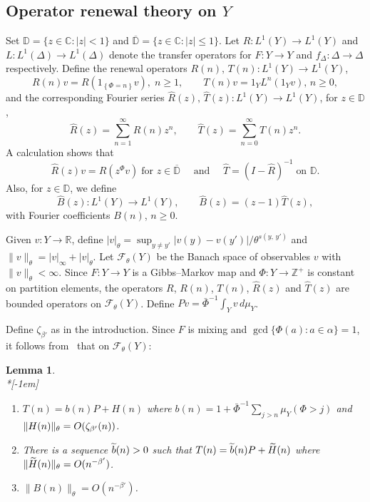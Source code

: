 \documentclass[10pt]{amsart}
\newtheorem{lemm}[theo]{Lemma}\newtheorem{prop}[theo]{Proposition}\newtheorem{coro}[theo]{Corollary}\newtheorem{conj}[theo]{Conjecture}
\theoremstyle{definition}\newtheorem{defi}[theo]{Definition}\newtheorem{rema}[theo]{Remark}\newtheorem{exam}[theo]{Example}\newtheorem{exem}[theo]{Example}\newtheorem{nota}[theo]{Notation}
\newcommand{\R}{\mathbb{R}}
\newcommand{\Z}{\mathbb{Z}}
\newcommand{\CX}{\mathbb{C}}
\newcommand{\D}{\mathbb{D}}
\newcommand{\cF}{\mathcal{F}}
\newcommand{\hB}{\widehat{B}}
\newcommand{\hR}{\widehat{R}}
\newcommand{\hT}{\widehat{T}}
\newcommand{\tH}{\widetilde{H}}
\newcommand{\barD}{\overline{\D}}
\newcommand{\bPhi}{\bar{\Phi}}
\newcommand*{\alphenumi}{\renewcommand*{\theenumi}{\alph{enumi}}}
\let\oldtilde\tilde
\renewcommand*{\tilde}[1]{\mathchoice{\widetilde{#1}}{\widetilde{#1}}{\oldtilde{#1}}{\oldtilde{#1}}}
\begin{document}
\subsection{Operator renewal theory on \texorpdfstring{$Y$}{Y}}\label{sec:TR}

Set $\D=\{z\in\CX:|z|<1\}$ and $\barD=\{z\in\CX:|z|\le1\}$. Let $R:L^1(Y)\to L^1(Y)$ and $L:L^1(\Delta)\to L^1(\Delta)$ denote the transfer operators for $F:Y\to Y$ and $f_\Delta:\Delta\to\Delta$ respectively. Define the renewal operators $R(n),\,T(n):L^1(Y)\to L^1(Y)$,
\[
R(n)v=R\left(1_{\left\{\Phi=n\right\}}v\right),\;n\ge1,\qquad T(n)v=1_Y L^n(1_Y v),\,n\ge0,
\]
and the corresponding Fourier series $\hR(z),\,\hT(z):L^1(Y)\to L^1(Y)$, for $z\in\D$,
\[
\hR(z)=\sum_{n=1}^\infty R(n)z^n,\qquad
\hT(z)=\sum_{n=0}^\infty T(n)z^n.
\]
A calculation shows that
\[
\hR(z)v=R(z^\Phi v)\;
\text{for }z\in\barD\quad \text{ and }\quad \hT=(I-\hR)^{-1}\;\text{on }\D.
\]
Also, for $z\in\D$, we define
\[
\hB(z):L^1(Y)\to L^1(Y), \qquad \hB(z)=(z-1)\hT(z),
\]
with Fourier coefficients $B(n)$, $n\ge0$.

Given $v:Y\to\R$, define $|v|_\theta=\sup_{y\neq y'}|v(y)-v(y')|/\theta^{s(y,\,y')}$ and $\|v\|_\theta=|v|_\infty+|v|_\theta$. Let $\cF_\theta(Y)$ be the Banach space of observables $v$ with $\|v\|_\theta<\infty$. Since $F:Y\to Y$ is a Gibbs--Markov map and $\Phi:Y\to\Z^+$ is constant on partition elements, the operators $R$, $R(n)$, $T(n)$, $\hR(z)$ and $\hT(z)$ are bounded operators on $\cF_\theta(Y)$. Define $Pv=\bPhi^{-1}\int_Y v\,d\mu_Y$.

Define $\zeta_{\beta'}$ as in the introduction. Since $F$ is mixing and $\gcd\{\Phi(a):a\in\alpha\}=1$, it follows from~\cite{Gouezel04a} that on $\cF_\theta(Y)$:

\begin{lemm}\label{lem:Tn}\ \\*[-1em]

\begin{enumerate}\alphenumi
\item \label{lemm4.3.1}$T(n)=b(n)P+H(n)$ where $b(n)=1+\bPhi^{-1}\sum_{j>n}\mu_Y(\Phi>j)$ and $\|H(n)\|_\theta\linebreak=O(\zeta_{\beta'}(n))$.
\item \label{lemm4.3.2}There is a sequence $\tilde b(n)>0$ such that $T(n)=\tilde b(n)P+\tH(n)$ where $\|\tH(n)\|_\theta\linebreak=O(n^{-\beta'})$.
\item \label{lemm4.3.3}$\|B(n)\|_\theta=O(n^{-\beta'})$.
\end{enumerate}
\end{lemm}
\end{document}
